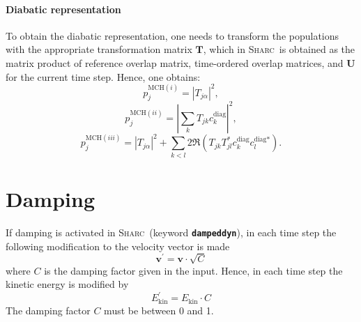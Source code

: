 \documentclass[a4paper,10pt,DIV=15,openany]{scrbook}
\newcommand{\sharc}{\textsc{Sharc}}
\newcommand{\ttt}[1]{\textbf{\texttt{#1}}}
\newcommand{\VEC}[1]{\ensuremath{\mathbf{#1}}}
\begin{document}
\paragraph{Diabatic representation}

To obtain the diabatic representation, one needs to transform the populations with the appropriate transformation matrix $\VEC{T}$, which in \sharc\ is obtained as the matrix product of reference overlap matrix, time-ordered overlap matrices, and $\VEC{U}$ for the current time step.
Hence, one obtains:
\begin{equation}
  p^{\text{MCH}(i)}_j=|T_{j\alpha}|^2,
\end{equation}
\begin{equation}
  p^{\text{MCH}(ii)}_j=|\sum_k T_{jk}c^\text{diag}_k|^2,
\end{equation}
\begin{equation}
  p^{\text{MCH}(iii)}_j=|T_{j\alpha}|^2+\sum_{k<l}2\Re(T_{jk}T^*_{jl}c^\text{diag}_kc^{\text{diag}*}_l).
\end{equation}






\section{Damping}\label{met:damping}

If damping is activated in \sharc\ (keyword \ttt{dampeddyn}), in each time step the following modification to the velocity vector is made
\begin{equation}
  \VEC{v}^\prime=\VEC{v}\cdot\sqrt{C}
\end{equation}
where $C$ is the damping factor given in the input. Hence, in each time step the kinetic energy is modified by
\begin{equation}
  E_{\text{kin}}^\prime=E_{\text{kin}}\cdot C
\end{equation}
The damping factor $C$ must be between 0 and 1.



% 
\end{document}
